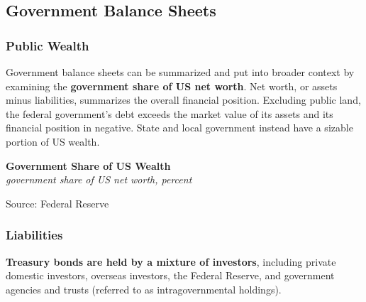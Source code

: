 \documentclass{report}
\makeatletter
\newcommand{\tbllink}[1]{\href{https://raw.githubusercontent.com/bdecon/US-chartbook/master/chartbook/data/#1}{\faTable}}
\newcommand*\short[1]{\expandafter\@gobbletwo\number\numexpr#1\relax}
\newcommand{\absnode}[3]{\node[below right, align=left] at (axis cs: #1,#2) {#3};}
\newcommand{\dateaxisticks}{
		date coordinates in=x, axis line style={draw=none},
		xmax={2023-02-15},
		max space between ticks=40,	    
		xtick={{1990-01-01}, {1992-01-01}, {1994-01-01}, 
			{1996-01-01}, {1998-01-01}, {2000-01-01}, 
			{2002-01-01}, {2004-01-01}, {2006-01-01},
			{2008-01-01}, {2010-01-01}, {2012-01-01}, {2014-01-01},
		    {2016-01-01}, {2018-01-01}, {2020-01-01}, {2022-01-01}, 
		    {2024-01-01}, {2026-01-01}},
		minor xtick={{1989-01-01}, {1991-01-01}, {1993-01-01},
			{1995-01-01}, {1997-01-01}, {1999-01-01}, 
			{2001-01-01}, {2003-01-01}, {2005-01-01}, {2007-01-01},
		    {2009-01-01}, {2011-01-01}, {2013-01-01}, {2015-01-01},
		    {2017-01-01}, {2019-01-01}, {2021-01-01}, {2023-01-01}, 
		    {2025-01-01}, {2027-01-01}},
		enlarge y limits={0.06}, enlarge x limits={0.01},
		}
\newcommand{\bbar}[2]{extra #1 ticks = {{#2}}, extra #1 tick labels = ,
		extra #1 tick style = {grid=major, grid style={thick, black!25}},}
\newcommand{\thickline}[4]{\addplot[ultra thick, no markers, color=#1] 
		table [x=#2, y=#3, col sep=comma] {#4};	}
\newcommand{\rbars}{
		\fill[color=black!10] (axis cs:{1990-07-01},\pgfkeysvalueof{/pgfplots/ymin}) rectangle 
			(axis cs:{1991-03-01}, \pgfkeysvalueof{/pgfplots/ymax});
		\fill[color=black!10] (axis cs:{2007-12-01},\pgfkeysvalueof{/pgfplots/ymin}) rectangle 
			(axis cs:{2009-07-01}, \pgfkeysvalueof{/pgfplots/ymax});
		\fill[color=black!10] (axis cs:{2001-03-01},\pgfkeysvalueof{/pgfplots/ymin}) rectangle 
			(axis cs:{2001-11-01}, \pgfkeysvalueof{/pgfplots/ymax});
		\fill[color=black!10] (axis cs:{2020-02-01},\pgfkeysvalueof{/pgfplots/ymin}) rectangle 
			(axis cs:{2020-05-01}, \pgfkeysvalueof{/pgfplots/ymax});}
\makeatother
\begin{document}
{\begin{minipage}{0.76\textwidth}
\subsection*{Government Balance Sheets}

\subsubsection*{Public Wealth}
\hypertarget{govbs}{}
\small Government balance sheets can be summarized and put into broader context by examining the \textbf{government share of US net worth}. Net worth, or assets minus liabilities, summarizes the overall financial position. Excluding public land, the federal government's debt exceeds the market value of its assets and its financial position in negative. State and local government instead have a sizable portion of US wealth. 


\vspace{2mm}

\normalsize \textbf{Government Share of US Wealth}\\
\footnotesize{\textit{government share of US net worth, percent}}
\vspace{4.2cm}

\hspace{6mm} 

\footnotesize{Source: Federal Reserve} \hfill \tbllink{govshnw.csv}
\end{minipage}
\newpage
\begin{minipage}{0.76\textwidth}
\subsubsection*{Liabilities}
\small \textbf{Treasury bonds are held by a mixture of investors}, including private domestic investors, overseas investors, the Federal Reserve, and government agencies and trusts (referred to as intragovernmental holdings). 


\end{minipage}}
\end{document}
